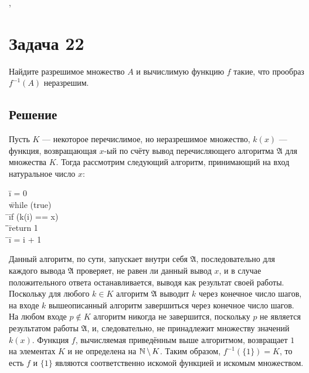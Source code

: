 \documentclass[a4paper,12pt]{article}
\newcommand {\gu} [1] {\guillemotleft#1\guillemotright}
\newcommand{\tab}{\quad\=}
\newenvironment{programm}{
    \ttfamily
    \begin{tabbing}
    }
    {
    \end{tabbing}
}
\begin{document}
	\sep
	
	\section*{Задача 22}
	Найдите разрешимое множество $A$ и вычислимую функцию $f$ такие, что прообраз $f^{-1}(A)$ неразрешим.
	\subsection*{Решение}
	Пусть $K$ --- некоторое перечислимое, но неразрешимое множество, $k(x)$ --- функция, возвращающая $x$-ый по счёту вывод перечисляющего алгоритма $\mathfrak{A}$ для множества $K$. Тогда рассмотрим следующий алгоритм, принимающий на вход натуральное число $x$:
	\begin{programm}
	\tab i = 0\\
	\tab while (true)\\
	\tab \tab if (k(i) == x)\\
	\tab \tab \tab return 1\\
	\tab \tab i = i + 1\\
	\end{programm}
	
	Данный алгоритм, по сути, запускает внутри себя $\mathfrak{A}$, последовательно для каждого вывода $\mathfrak{A}$ проверяет, не равен ли данный вывод $x$, и в случае положительного ответа останавливается, выводя \gu{1} как результат своей работы. Поскольку для любого $k\in K$ алгоритм $\mathfrak{A}$ выводит $k$ через конечное число шагов, на входе $k$ вышеописанный алгоритм завершиться через конечное число шагов. На любом входе $p\not\in K$ алгоритм никогда не завершится, поскольку $p$ не является результатом работы $\mathfrak{A}$, и, следовательно, не принадлежит множеству значений $k(x)$. Функция $f$, вычисляемая приведённым выше алгоритмом, возвращает $1$ на элементах $K$ и не определена на $\mathbb{N}\,\backslash\,K$. Таким образом, $f^{-1}(\{1\})=K$, то есть $f$ и $\{1\}$ являются соответственно искомой функцией и искомым множеством.

	
\end{document}
